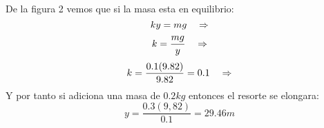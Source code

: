 \documentclass[a4paper]{article}
\begin{document}
    \begin{answer}[Problema 9.]
    De la figura 2 vemos que si la masa esta en equilibrio:
    $$ky = mg\hspace{0.35cm}\Rightarrow$$
    $$k = \frac{mg}{y}\hspace{0.35cm}\Rightarrow$$
    $$k = \frac{0.1(9.82) }{9.82} = 0.1\hspace{0.35cm}\Rightarrow$$
    Y por tanto si adiciona una masa de $0.2kg$
    entonces el resorte se elongara:
    $$y = \frac{0.3(9,82)}{0.1} = 29.46m$$
    
    
    
    \end{answer}
    
\end{document}
